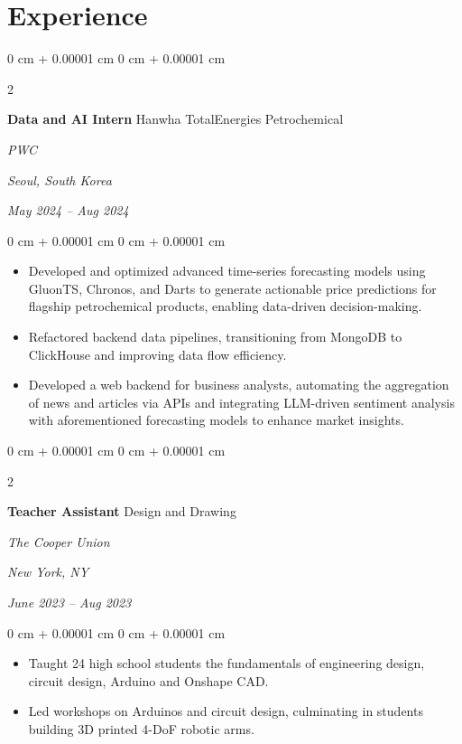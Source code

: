 \documentclass[11pt, letterpaper]{article}
\newenvironment{highlights}{
    \begin{itemize}[
        topsep=0.1 cm,
        parsep=0.1 cm,
        partopsep=0pt,
        itemsep=0pt,
        leftmargin=0 cm + 10pt
    ]
}{
    \end{itemize}
} %
\newenvironment{onecolentry}{
    \begin{adjustwidth}{
        0 cm + 0.00001 cm
    }{
        0 cm + 0.00001 cm
    }
}{
    \end{adjustwidth}
} %
\newenvironment{twocolentry}[2][]{
    \onecolentry
    \def\secondColumn{#2}
    \setcolumnwidth{\fill, 4.5 cm}
    \begin{paracol}{2}
}{
    \switchcolumn \raggedleft \secondColumn
    \end{paracol}
    \endonecolentry
} %
\begin{document}
    
    \section{Experience}



        
        \begin{twocolentry}{
        \textit{Seoul, South Korea}    
            
        \textit{May 2024 – Aug 2024}}
            \textbf{Data and AI Intern}
         \textbar{} \textnormal{Hanwha TotalEnergies Petrochemical}    

            \textit{PWC}
        \end{twocolentry}

        \vspace{0.1 cm}
        \begin{onecolentry}
            \begin{highlights}
                \item Developed and optimized advanced time-series forecasting models using GluonTS, Chronos, and Darts to generate actionable price predictions for flagship petrochemical products, enabling data-driven decision-making.
                \item Refactored backend data pipelines, transitioning from MongoDB to ClickHouse and improving data flow efficiency.
                \item Developed a web backend for business analysts, automating the aggregation of news and articles via APIs and integrating LLM-driven sentiment analysis with aforementioned forecasting models to enhance market insights.
            \end{highlights}
        \end{onecolentry}


        \vspace{0.15 cm}

        \begin{twocolentry}{
        \textit{New York, NY}    
            
        \textit{June 2023 – Aug 2023}}
            \textbf{Teacher Assistant}
         \textbar{} \textnormal{Design and Drawing}    

            \textit{The Cooper Union}
        \end{twocolentry}

        \vspace{0.1 cm}
        \begin{onecolentry}
            \begin{highlights}
                \item Taught 24 high school students the fundamentals of engineering design, circuit design, Arduino and Onshape CAD.
                \item Led workshops on Arduinos and circuit design, culminating in students building 3D printed 4-DoF robotic arms.
            \end{highlights}
        \end{onecolentry}
\end{document}
